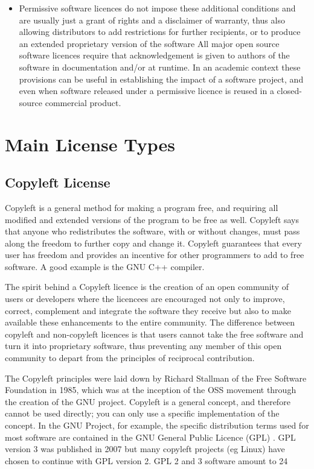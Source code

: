\documentclass[12pt,a4paper]{article}
\begin{document}
\begin{itemize}
\item Permissive software licences do not impose these additional conditions and are usually just a grant of rights and a disclaimer of warranty, thus also allowing distributors to add restrictions for further recipients, or to produce an extended proprietary version of the software
All major open source software licences require that acknowledgement is given to authors of the software in documentation and/or at runtime. In an academic context these provisions can be useful in establishing the impact of a software project, and even when software released under a permissive licence is reused in a closed-source commercial product. 

\end{itemize}

\section{Main License Types}
\label{sec:MainLicenseTypes}

\subsection{Copyleft License}
\label{sec:CopyleftLicense}

Copyleft is a general method for making a program free, and requiring all modified and extended versions of the program to be free as well. Copyleft says that anyone who redistributes the software, with or without changes, must pass along the freedom to further copy and change it. Copyleft guarantees that every user has freedom and provides an incentive for other programmers to add to free software. A good example is the GNU C++ compiler.

The spirit behind a Copyleft licence is the creation of an open community of users or developers where the licencees are encouraged not only to improve, correct, complement and integrate the software they receive but also to make available these enhancements to the entire community. The difference between copyleft and non-copyleft licences is that users cannot take the free software and turn it into proprietary software, thus preventing any member of this open community to depart from the principles of reciprocal contribution. 

The Copyleft principles were laid down by Richard Stallman of the Free Software Foundation in 1985, which was at the inception of the OSS movement through the creation of the GNU project. Copyleft is a general concept, and therefore cannot be used directly; you can only use a specific implementation of the concept. In the GNU Project, for example, the specific distribution terms used for most software are contained in the GNU General Public Licence (GPL) \cite{[4]}. GPL version 3 was published in 2007 but many copyleft projects (eg Linux) have chosen to continue with GPL version 2.
GPL 2 and 3 software amount to 24%
\end{document}
